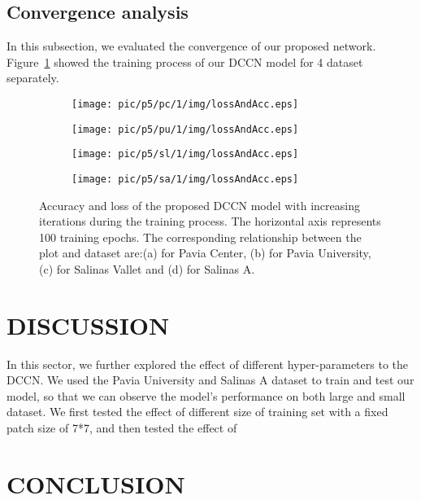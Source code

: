 \documentclass{article}
\begin{document}
	\subsection{Convergence analysis}\label{subsec:convergence}
	In this subsection, we evaluated the convergence of our proposed network.
	Figure~\ref{accandloss} showed the training process of our DCCN model for 4 dataset separately.
	\begin{figure}[htb]
		\begin{subfigure}{0.24\textwidth}
			\texttt{[image: pic/p5/pc/1/img/lossAndAcc.eps]}
			\caption{}
		\end{subfigure}
		\begin{subfigure}{0.24\textwidth}
			\texttt{[image: pic/p5/pu/1/img/lossAndAcc.eps]}
			\caption{}
		\end{subfigure}
		\begin{subfigure}{0.24\textwidth}
			\texttt{[image: pic/p5/sl/1/img/lossAndAcc.eps]}
			\caption{}
		\end{subfigure}
		\begin{subfigure}{0.24\textwidth}
			\texttt{[image: pic/p5/sa/1/img/lossAndAcc.eps]}
			\caption{}
		\end{subfigure}
		\caption{Accuracy and loss of the proposed DCCN model with increasing iterations during the training process.
		The horizontal axis represents 100 training epochs.
		The corresponding relationship between the plot and dataset are:(a) for Pavia Center, (b) for Pavia University,
			(c) for Salinas Vallet and (d) for Salinas A.}
		\label{accandloss}
	\end{figure}


	\section{DISCUSSION}\label{sec:discussion}
	In this sector, we further explored the effect of different hyper-parameters to the DCCN\@.
	We used the Pavia University and Salinas A dataset to train and test our model, so that we can observe the model's
	performance on both large and small dataset.
	We first tested the effect of different size of training set with a fixed patch size of 7*7, and then tested the
	effect of


	\section{CONCLUSION}\label{sec:conclusion}


	
\end{document}
